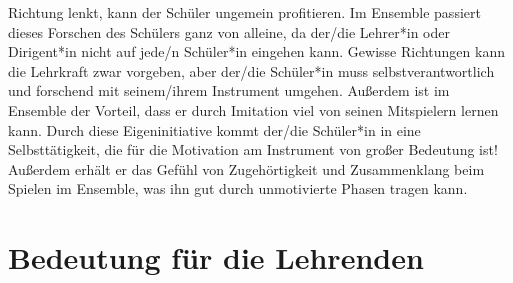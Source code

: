 Richtung lenkt, kann der Schüler ungemein profitieren. Im Ensemble passiert
dieses Forschen des Schülers ganz von alleine, da der/die Lehrer*in oder
Dirigent*in nicht auf jede/n Schüler*in eingehen kann. Gewisse Richtungen kann
die Lehrkraft zwar vorgeben, aber der/die Schüler*in muss selbstverantwortlich
und forschend mit seinem/ihrem Instrument umgehen. Außerdem ist im Ensemble der
Vorteil, dass er durch Imitation viel von seinen Mitspielern lernen kann. Durch
diese Eigeninitiative kommt der/die Schüler*in in eine Selbsttätigkeit, die für
die Motivation am Instrument von großer Bedeutung ist! Außerdem erhält er das
Gefühl von Zugehörtigkeit und Zusammenklang beim Spielen im Ensemble, was ihn
gut durch unmotivierte Phasen tragen kann.

\section{Bedeutung für die Lehrenden}


